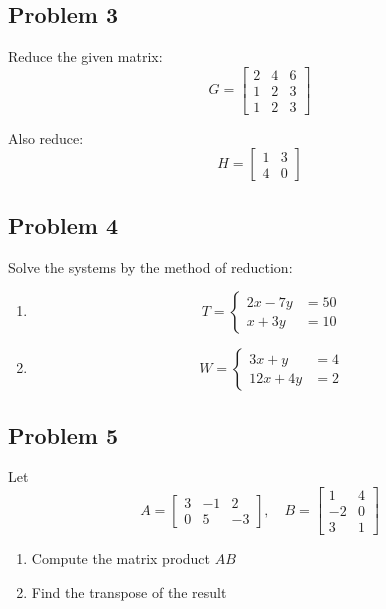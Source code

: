 \documentclass[12pt]{article}
\begin{document}
\subsection*{Problem 3}
Reduce the given matrix:
\[
G = \begin{bmatrix}
2 & 4 & 6 \\
1 & 2 & 3 \\
1 & 2 & 3
\end{bmatrix}
\]

Also reduce:
\[
H = \begin{bmatrix}
1 & 3 \\
4 & 0
\end{bmatrix}
\]

\subsection*{Problem 4}
Solve the systems by the method of reduction:

\begin{enumerate}[label=\alph*.]
    \item 
    \[
    T = \left\{
    \begin{aligned}
    2x - 7y &= 50 \\
    x + 3y &= 10
    \end{aligned}
    \right.
    \]
    \item 
    \[
    W = \left\{
    \begin{aligned}
    3x + y &= 4 \\
    12x + 4y &= 2
    \end{aligned}
    \right.
    \]
\end{enumerate}

\subsection*{Problem 5}
Let
\[
A = \begin{bmatrix}
3 & -1 & 2 \\
0 & 5 & -3
\end{bmatrix}, \quad
B = \begin{bmatrix}
1 & 4 \\
-2 & 0 \\
3 & 1
\end{bmatrix}
\]

\begin{enumerate}[label=\alph*.]
    \item Compute the matrix product \( AB \)
    \item Find the transpose of the result
\end{enumerate}
\end{document}
